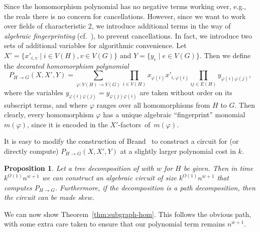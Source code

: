 \documentclass[10pt,a4paper]{article}
\newtheorem{proposition}{Proposition}[section]
\begin{document}
Since the homomorphism polynomial has no negative terms working over,
e.g., the reals there is no concern for cancellations. However, since
we want to work over fields of characteristic 2, we introduce
additional terms in the way of \emph{algebraic fingerprinting}
(cf.~\cite{KoutisW16CACM}), to prevent cancellations.
In fact, we introduce two sets of additional variables for algorithmic
convenience. Let $X'=\{x'_{i,v} \mid i \in V(H), v \in V(G)\}$
and $Y=\{y_e \mid e \in V(G)\}$. Then we define
the \emph{decorated homomorphism polynomial}
\[
  P_{H \to G}(X,X',Y) = \sum_{\varphi \colon V(H) \to V(G)}
  \prod_{i \in V(H)} x_{\varphi(i)} x'_{i,\varphi(i)} 
  \prod_{ij \in E(H)} y_{\varphi(i)\varphi(j)},
\]
where the variables $y_{\varphi(i)\varphi(j)}=y_{\varphi(j)\varphi(i)}$
are taken without order on its subscript terms,
and where $\varphi$ ranges over all homomorphisms from $H$ to $G$. 
Then clearly, every homomorphism $\varphi$ has a unique algebraic
``fingerprint'' monomial $m(\varphi)$,  since it is encoded in the
$X'$-factors~of~$m(\varphi)$.

It is easy to modify the construction of Brand~\cite[Section~4.6.1]{Brand19thesis}
to construct a circuit for (or directly compute) $P_{H \to G}(X,X',Y)$
at a slightly larger polynomial cost in $k$.

\begin{proposition}
  Let a tree decomposition of with $w$ for $H$ be given. Then in time
  $k^{O(1)}n^{w+1}$ we can construct an algebraic circuit of size
  $k^{O(1)}n^{w+1}$ that computes $P_{H \to G}$. Furthermore, if the
  decomposition is a path decomposition, then the circuit can be made
  skew.   
\end{proposition}

We can now show Theorem~\ref{thm:subgraph-hom}. This follows the
obvious path, with some extra care taken to ensure that our polynomial
term remains $n^{w+1}$.
\end{document}
